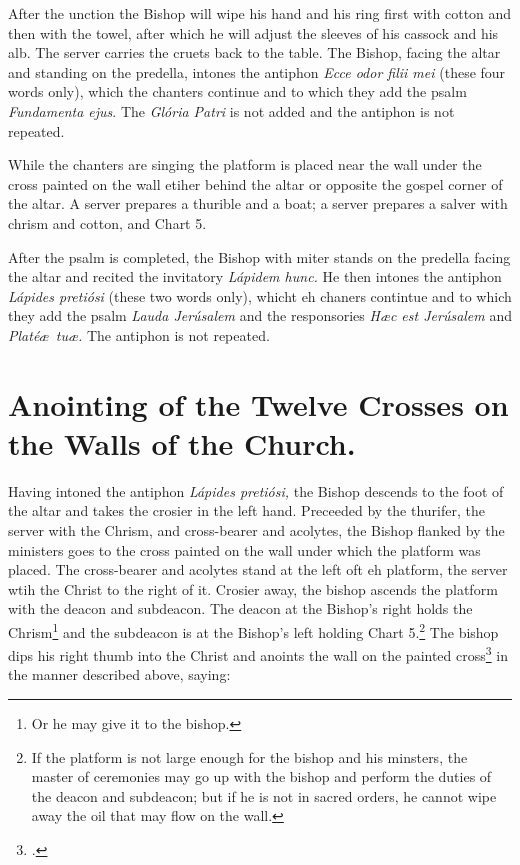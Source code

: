 \documentclass[letterpaper]{report}
\begin{document}
{\rubric After the unction the Bishop will wipe his hand and his ring first with
cotton and then with the towel, after which he will adjust the sleeves of his
cassock and his alb. The server carries the cruets back to the table. The
Bishop, facing the altar and standing on the predella, intones the antiphon
\textit{Ecce odor filii mei} (these four words only), which the chanters
continue and to which they add the psalm \textit{Fundamenta ejus}. The
\textit{Glória Patri} is not added and the antiphon is not repeated.

While the chanters are singing the platform is placed near the wall under the
cross painted on the wall etiher behind the altar or opposite the gospel corner
of the altar. A server prepares a thurible and a boat; a server prepares a
salver with chrism and cotton, and Chart 5.

\rubric After the psalm is completed, the Bishop with miter stands on the
predella facing the altar and recited the invitatory \textit{Lápidem hunc.} He
then intones the antiphon \textit{Lápides pretiósi} (these two words only),
whicht eh chaners contintue and to which they add the psalm \textit{Lauda
Jerúsalem} and the responsories \textit{H\ae c est Jerúsalem} and
\textit{Platé\ae\ tu\ae.} The antiphon is not repeated.

\section{Anointing of the Twelve Crosses on the Walls of the Church.}

\rubric Having intoned the antiphon \textit{Lápides pretiósi,} the Bishop
descends to the foot of the altar and takes the crosier in the left hand.
Preceeded by the thurifer, the server with the Chrism, and cross-bearer and
acolytes, the Bishop flanked by the ministers goes to the cross painted on the
wall under which the platform was placed. The cross-bearer and acolytes stand
at the left oft eh platform, the server wtih the Christ to the right of it.
Crosier away, the bishop ascends the platform with the deacon and subdeacon.
The deacon at the Bishop's right holds the Chrism\footnote{Or he may give it to
the bishop.} and the subdeacon is at the Bishop's left holding Chart
5.\footnote{If the platform is not large enough for the bishop and his
minsters, the master of ceremonies may go up with the bishop and perform the
duties of the deacon and subdeacon; but if he is not in sacred orders, he
cannot wipe away the oil that may flow on the wall.} The bishop dips his right
thumb into the Christ and anoints the wall on the painted
cross\footcite[\textit{Above} or \textit{below} the cross, if it be of marble
or metal. See][note 2, p. 112.]{sthele} in the manner described above, saying:

}
\end{document}
